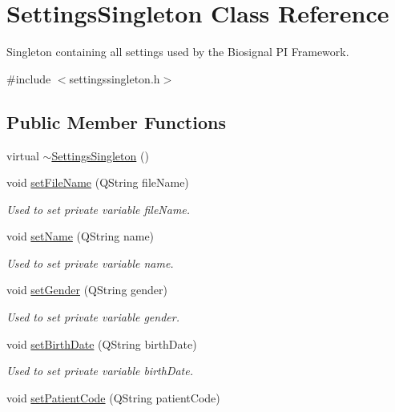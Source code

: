 \hypertarget{classSettingsSingleton}{}\section{Settings\+Singleton Class Reference}
\label{classSettingsSingleton}


Singleton containing all settings used by the Biosignal PI Framework.  




{\ttfamily \#include $<$settingssingleton.\+h$>$}

\subsection*{Public Member Functions}
\begin{DoxyCompactItemize}
\item 
virtual \hyperlink{classSettingsSingleton_a91b78db84657cbeb299c30e4aac3c269}{$\sim$\+Settings\+Singleton} ()
\item 
void \hyperlink{classSettingsSingleton_aec045fc249983ef4ac0de4ba8925b300}{set\+File\+Name} (Q\+String file\+Name)
\begin{DoxyCompactList}\small\item\em Used to set private variable file\+Name. \end{DoxyCompactList}\item 
void \hyperlink{classSettingsSingleton_a383c335986ea26502cb65886a9fea1ac}{set\+Name} (Q\+String name)
\begin{DoxyCompactList}\small\item\em Used to set private variable name. \end{DoxyCompactList}\item 
void \hyperlink{classSettingsSingleton_a00746454430a23dc51fd64834e35bf0f}{set\+Gender} (Q\+String gender)
\begin{DoxyCompactList}\small\item\em Used to set private variable gender. \end{DoxyCompactList}\item 
void \hyperlink{classSettingsSingleton_a1b23c39146607ea723fc97f570e6e3e1}{set\+Birth\+Date} (Q\+String birth\+Date)
\begin{DoxyCompactList}\small\item\em Used to set private variable birth\+Date. \end{DoxyCompactList}\item 
void \hyperlink{classSettingsSingleton_a43d597e9d39a9b76a11c4575d8d71adc}{set\+Patient\+Code} (Q\+String patient\+Code)

\end{DoxyCompactItemize}
